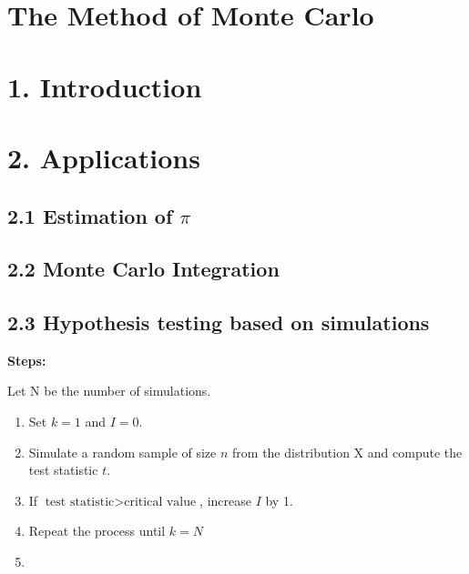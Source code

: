 \documentclass[]{article}
\author{}
\date{\vspace{-2.5em}}
\begin{document}
\hypertarget{the-method-of-monte-carlo}{%
\section{The Method of Monte Carlo}\label{the-method-of-monte-carlo}}

\hypertarget{introduction}{%
\section{1. Introduction}\label{introduction}}

\hypertarget{applications}{%
\section{2. Applications}\label{applications}}

\hypertarget{estimation-of-pi}{%
\subsection{\texorpdfstring{2.1 Estimation of
\(\pi\)}{2.1 Estimation of \textbackslash{}pi}}\label{estimation-of-pi}}

\hypertarget{monte-carlo-integration}{%
\subsection{2.2 Monte Carlo Integration}\label{monte-carlo-integration}}

\hypertarget{hypothesis-testing-based-on-simulations}{%
\subsection{2.3 Hypothesis testing based on
simulations}\label{hypothesis-testing-based-on-simulations}}

\textbf{Steps: }

Let N be the number of simulations.

\begin{enumerate}
\def\labelenumi{\arabic{enumi}.}
\item
  Set \(k=1\) and \(I = 0\).
\item
  Simulate a random sample of size \(n\) from the distribution X and
  compute the test statistic \(t\).
\item
  If \(\text{test statistic} > \text{critical value}\), increase \(I\)
  by 1.
\item
  Repeat the process until \(k=N\)
\item
\end{enumerate}
\end{document}

